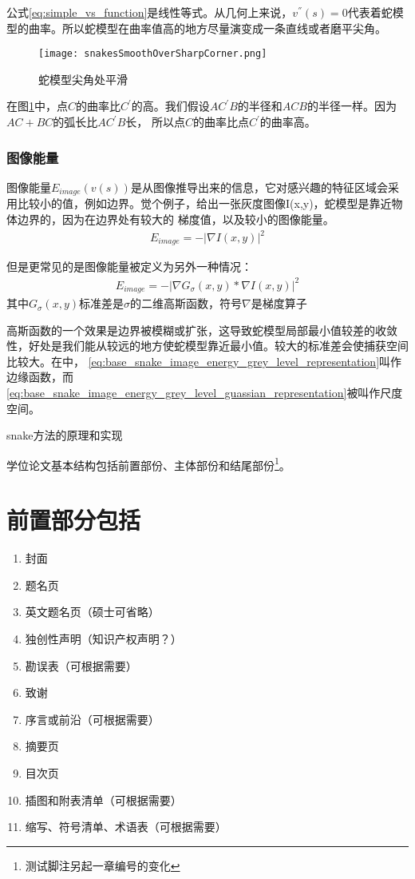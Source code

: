 公式\eqref{eq:simple_vs_function}是线性等式。从几何上来说，$v^{''}(s)=0$代表着蛇模型的曲率。所以蛇模型在曲率值高的地方尽量演变成一条直线或者磨平尖角。

\begin{figure}[htbp]
	\centering
	\texttt{[image: snakesSmoothOverSharpCorner.png]}
	\caption{蛇模型尖角处平滑}\label{fig:snakesSmoothOverSharpCorner}
\end{figure}

在图\ref{fig:snakesSmoothOverSharpCorner}中，点$C$的曲率比$C^{'}$的高。我们假设$AC^{'}B$的半径和$ACB$的半径一样。因为$AC+BC$的弧长比$AC^{'}B$长，
所以点$C$的曲率比点$C^{'}$的曲率高。

\subsubsection{图像能量}
图像能量$E_{image}(v(s))$是从图像推导出来的信息，它对感兴趣的特征区域会采用比较小的值，例如边界。觉个例子，给出一张灰度图像I(x,y)，蛇模型是靠近物体边界的，因为在边界处有较大的
梯度值，以及较小的图像能量。
\begin{align}\label{eq:base_snake_image_energy_grey_level_representation}
	E_{image} = -|\nabla I(x,y)|^{2}
\end{align}

但是更常见的是图像能量被定义为另外一种情况：
\begin{align}\label{eq:base_snake_image_energy_grey_level_guassian_representation}
E_{image} = -|\nabla G_{\sigma}(x,y) *  \nabla I(x,y)|^{2}
\end{align}
其中$G_{\sigma}(x,y)$标准差是$\sigma$的二维高斯函数，符号$\nabla$是梯度算子

高斯函数的一个效果是边界被模糊或扩张，这导致蛇模型局部最小值较差的收敛性，好处是我们能从较远的地方使蛇模型靠近最小值。较大的标准差会使捕获空间比较大。在\cite{kass1988snakes}中，
\eqref{eq:base_snake_image_energy_grey_level_representation}叫作边缘函数，而\eqref{eq:base_snake_image_energy_grey_level_guassian_representation}被叫作尺度空间。


snake方法的原理和实现

学位论文基本结构包括前置部份、主体部份和结尾部份\footnote{测试脚注另起一章编号的变化}。
\section{前置部分包括}
\begin{enumerate}
	\item 封面
	\item 题名页
	\item 英文题名页（硕士可省略）
	\item 独创性声明（知识产权声明？）
	\item 勘误表（可根据需要）
	\item 致谢
	\item 序言或前沿（可根据需要）
	\item 摘要页
	\item 目次页
	\item 插图和附表清单（可根据需要）
	\item 缩写、符号清单、术语表（可根据需要）
\end{enumerate}
